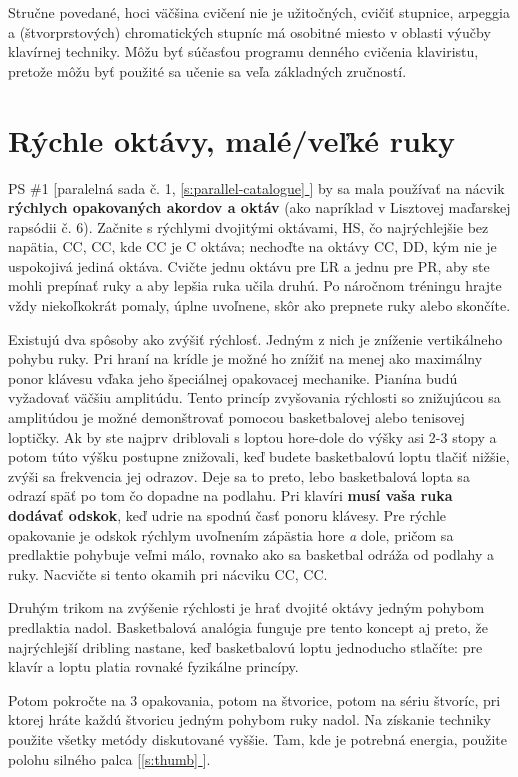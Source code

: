 \documentclass[11pt,a4paper]{book}
\newcommand*{\fullref}[1]{\hyperref[{#1}]{\ref*{#1} \nameref*{#1}}} %
\newcommand*{\fullrefp}[1]{[\fullref{#1}]} %
\begin{document}
Stručne povedané, hoci väčšina cvičení nie je užitočných, cvičiť stupnice, arpeggia a (štvorprstových) chromatických stupníc má osobitné miesto v oblasti výučby klavírnej techniky. Môžu byť súčasťou programu denného cvičenia klaviristu, pretože môžu byť použité sa učenie sa veľa základných zručností.

\section{Rýchle oktávy, malé/veľké ruky}\label{s:fast-octaves}
PS \#1 [paralelná sada č. 1, \fullref{s:parallel-catalogue}] by sa mala používať na nácvik \textbf{rýchlych opakovaných akordov a oktáv} (ako napríklad v Lisztovej maďarskej rapsódii č. 6). Začnite s rýchlymi dvojitými oktávami, HS, čo najrýchlejšie bez napätia, CC, CC, kde CC je C oktáva; nechoďte na oktávy CC, DD, kým nie je uspokojivá jediná oktáva. Cvičte jednu oktávu pre ĽR a jednu pre PR, aby ste mohli prepínať ruky a aby lepšia ruka učila druhú. Po náročnom tréningu hrajte vždy niekoľkokrát pomaly, úplne uvoľnene, skôr ako prepnete ruky alebo skončíte.    

Existujú dva spôsoby ako zvýšiť rýchlosť. Jedným z nich je zníženie vertikálneho pohybu ruky. Pri hraní na krídle je možné ho znížiť na menej ako maximálny ponor klávesu vďaka jeho špeciálnej opakovacej mechanike. Pianína budú vyžadovať väčšiu amplitúdu. Tento princíp zvyšovania rýchlosti so znižujúcou sa amplitúdou je možné demonštrovať pomocou basketbalovej alebo tenisovej loptičky. Ak by ste najprv driblovali s loptou hore-dole do výšky asi 2-3 stopy a potom túto výšku postupne znižovali, keď budete basketbalovú loptu tlačiť nižšie, zvýši sa frekvencia jej odrazov. Deje sa to preto, lebo basketbalová lopta sa odrazí späť po tom čo dopadne na podlahu. Pri klavíri \textbf{musí vaša ruka dodávať odskok}, keď udrie na spodnú časť ponoru klávesy. Pre rýchle opakovanie je odskok rýchlym uvoľnením zápästia hore \textit{a} dole, pričom sa predlaktie pohybuje veľmi málo, rovnako ako sa basketbal odráža od podlahy a ruky. Nacvičte si tento okamih pri nácviku CC, CC.        

Druhým trikom na zvýšenie rýchlosti je hrať dvojité oktávy jedným pohybom predlaktia nadol. Basketbalová analógia funguje pre tento koncept aj preto, že najrýchlejší dribling nastane, keď basketbalovú loptu jednoducho stlačíte: pre klavír a loptu platia rovnaké fyzikálne princípy. 

Potom pokročte na 3 opakovania, potom na štvorice, potom na sériu štvoríc, pri ktorej hráte každú štvoricu jedným pohybom ruky nadol. Na získanie techniky použite všetky metódy diskutované vyššie. Tam, kde je potrebná energia, použite polohu silného palca \fullrefp{s:thumb}.
\end{document}
